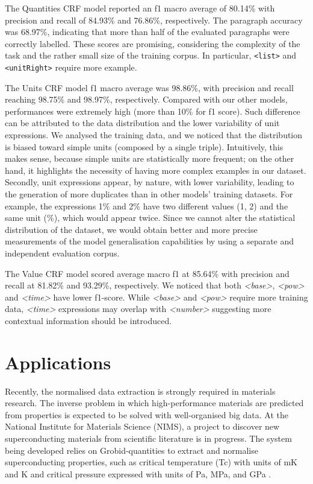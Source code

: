 The Quantities CRF model reported an f1 macro average of 80.14\% with precision and recall of 84.93\% and 76.86\%, respectively. The paragraph accuracy was 68.97\%, indicating that more than half of the evaluated paragraphs were correctly labelled. These scores are promising, considering the complexity of the task and the rather small size of the training corpus. In particular, \texttt{<list>} and \texttt{<unitRight>} require more example. 

The Units CRF model f1 macro average was 98.86\%, with precision and recall reaching 98.75\% and 98.97\%, respectively. Compared with our other models, performances were extremely high (more than 10\% for f1 score). 
Such difference can be attributed to the data distribution and the lower variability of unit expressions. We analysed the training data, and we noticed that the distribution is biased toward simple units (composed by a single triple). Intuitively, this makes sense, because simple units are statistically more frequent; on the other hand, it highlights the necessity of having more complex examples in our dataset. 
Secondly, unit expressions appear, by nature, with lower variability, leading to the generation of more duplicates than in other models' training datasets. For example, the expressions 1\% and 2\% have two different values (1, 2) and the same unit (\%), which would appear twice. 
Since we cannot alter the statistical distribution of the dataset, we would obtain better and more precise measurements of the model generalisation capabilities by using a separate and independent evaluation corpus. 

The Value CRF model scored average macro f1 at 85.64\% with precision and recall at 81.82\% and 93.29\%, respectively.
We noticed that both \textit{<base>}, \textit{<pow>} and \textit{<time>} have lower f1-score. While \textit{<base>} and \textit{<pow>} require more training data, \textit{<time>} expressions may overlap with \textit{<number>} suggesting more contextual information should be introduced. 


\section{Applications}
\label{sec:use_cases}
Recently, the normalised data extraction is strongly required in materials research. The inverse problem in which high-performance materials are predicted from properties is expected to be solved with well-organised big data. At the National Institute for Materials Science (NIMS), a project to discover new superconducting materials from scientific literature is in progress. The system being developed relies on Grobid-quantities to extract and normalise superconducting properties, such as critical temperature (Tc) with units of mK and K and critical pressure expressed with units of Pa, MPa, and GPa \cite{foppiano2019proposal}. 

